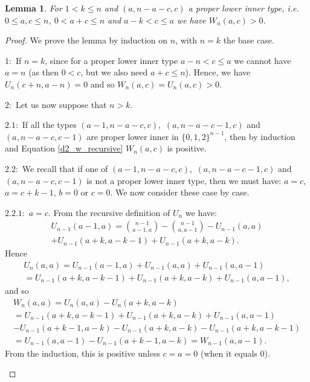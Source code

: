 \documentclass[11pt, reqno]{amsart}
\newenvironment{caseindent}[1][2em]
  {%
    \begin{list}{}{%
      \setlength{\leftmargin}{#1}%
      \setlength{\rightmargin}{0pt}%
      \setlength{\topsep}{0pt}%
      \setlength{\partopsep}{0pt}%
      \setlength{\itemsep}{0pt}%
      \setlength{\parsep}{\parskip}%
      \setlength{\listparindent}{\parindent}%
    }%
    \item[]%
    \let\fullwidthdisplay\relax
    \ignorespaces
  }
  {%
    \end{list}%
    \ignorespacesafterend
  }
\newcommand{\leanblueprintbase}{https://mj141592.github.io/weighted-chains-paper}
\newif\ifleanlinks
\newcommand{\leanblueprint}[1]{%
  \ifleanlinks
    \leavevmode\unskip\penalty9999\hbox{}\nobreak\hfill\quad
    \href{\leanblueprintbase/theorems/#1/}{%
      \mbox{\normalfont\footnotesize\textcolor{blue}{[\textsf{Lean formalisation}]}}}%
    \par\nobreak
  \fi
}
\newtheorem{lemma}[theorem]{Lemma}
\theoremstyle{remark}
\numberwithin{equation}{section}
\newcommand{\wn}{W_{n}}
\newcommand{\wno}{W_{n-1}}
\newcommand{\un}{U_{n}}
\newcommand{\uno}{U_{n-1}}
\begin{document}
\begin{lemma}
\label{wc:lem:ternary-inner-weight-positive}
    For $1 < k \leqslant n$ and $(a, n-a-c, c)$ a proper lower inner type, i.e. $0 \leqslant a, c \leqslant n$, $0<a+c\leqslant n$ and $a-k<c\leqslant a$ we have $\wn(a, c)>0$.
\leanblueprint{ternary-inner-weight-positive}
\end{lemma}

\begin{proof}
    We prove the lemma by induction on $n$, with $n=k$ the base case.

    $1:$ If $n=k$, since for a proper lower inner type $a-n<c\leqslant a$ we cannot have $a=n$ (as then $0<c$, but we also need $a+c \leqslant n$). Hence, we have $\un(c+n, a-n)=0$ and so $W_n(a, c)=U_n(a, c)>0$.

    $2:$ Let us now suppose that $n>k$.
        \begin{caseindent}
        $2.1:$ If all the types $(a-1, n-a-c, c),$ $(a, n-a-c-1, c)$ and $(a, n-a-c, c-1)$ are proper lower inner in $\{0, 1, 2\}^{n-1}$, then by induction and Equation \ref{d2_w_recursive} $\wn(a, c)$ is positive.

        $2.2:$ We recall that if one of $(a-1, n-a-c, c),$ $(a, n-a-c-1, c)$ and $(a, n-a-c, c-1)$ is not a proper lower inner type, then we must have: $a=c$, $a=c+k-1$, $b=0$ or $c=0$. We now consider these case by case.
        \begin{caseindent}
        $2.2.1:$ $a=c$. From the recursive definition of $U_n$ we have:
            \begin{multline*}
                U_{n-1}(a-1, a)=\binom{n-1}{a-1, a}-\binom{n-1}{a, a-1}-\uno(a, a)\\ + \uno(a+k, a-k-1)+\uno(a+k, a-k).
            \end{multline*}
            Hence
            \begin{multline*}
                \un(a, a)
                =\uno(a-1, a)+\uno(a, a)+U_{n-1}(a, a-1)\\
                =\uno(a+k, a-k-1)+\uno(a+k, a-k) + \uno(a, a-1),
            \end{multline*}
            and so
            \begin{multline*}
                \wn(a, a)=\un(a, a) - \un(a+k, a-k)\\
                = \uno(a+k, a-k-1)+\uno(a+k, a-k)+\uno(a, a-1)\\
                - \uno(a+k-1, a-k) - \uno(a+k, a-k) - \uno(a+k, a-k-1)\\
                = \uno(a, a-1) - \uno(a+k-1, a-k)=\wno(a, a-1).
            \end{multline*}
            From the induction, this is positive unless $c=a=0$ (when it equals $0$).
    

\end{caseindent}
\end{caseindent}
\end{proof}
\end{document}
